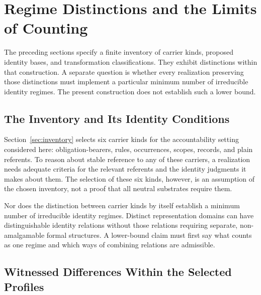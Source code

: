 
\section{Regime Distinctions and the Limits of Counting}
\label{sec:bound}

The preceding sections specify a finite inventory of carrier kinds,
proposed identity bases, and transformation classifications.
They exhibit distinctions within that construction.
A separate question is whether every realization preserving those
distinctions must implement a particular minimum number of
irreducible identity regimes.
The present construction does not establish such a lower bound.

\subsection{The Inventory and Its Identity Conditions}
\label{subsec:inventory_floor}

Section~\ref{sec:inventory} selects six carrier kinds for the
accountability setting considered here:
obligation-bearers, rules, occurrences, scopes, records, and plain referents.
To reason about stable reference to any of these carriers, a realization
needs adequate criteria for the relevant referents and the identity
judgments it makes about them.
The selection of these six kinds, however, is an assumption of the
chosen inventory, not a proof that all neutral substrates require them.

Nor does the distinction between carrier kinds by itself establish a
minimum number of irreducible identity regimes.
Distinct representation domains can have distinguishable identity
relations without those relations requiring separate, non-amalgamable
formal structures.
A lower-bound claim must first say what counts as one regime and which
ways of combining relations are admissible.

\subsection{Witnessed Differences Within the Selected Profiles}
\label{subsec:witnessed_splits}


